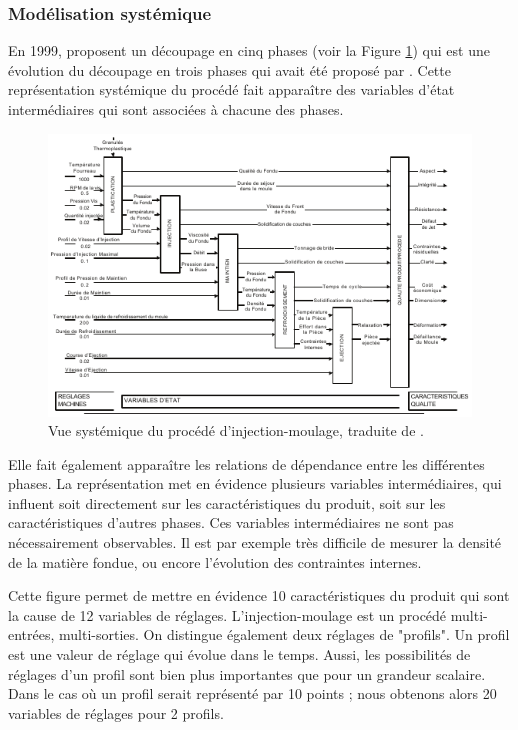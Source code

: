 \subsubsection{Modélisation systémique} \label{subsubsec:molding_systemic}
En 1999, \citeauthor{kazmer_towards_1999} proposent un découpage en cinq phases \cite{kazmer_towards_1999} (voir la Figure \ref{fig:kazmer_systematic}) qui est une évolution du découpage en trois phases qui avait été proposé par \citeauthor{ma_design_1974} \cite{ma_design_1974}.
Cette représentation systémique du procédé fait apparaître des variables d’état intermédiaires qui sont associées à chacune des phases.

\begin{figure}[bthp]
	\centering
	\includegraphics[width=\textwidth,height=\textheight,keepaspectratio]{../Chap1/Figures/Kazmer_1999-Process.pdf}
	\caption{Vue systémique du procédé d'injection-moulage, traduite de \citeauthor{kazmer_towards_1999} \cite{kazmer_towards_1999}.}
	\label{fig:kazmer_systematic}
\end{figure}

Elle fait également apparaître les relations de dépendance entre les différentes phases.
La représentation met en évidence plusieurs variables intermédiaires, qui influent soit directement sur les caractéristiques du produit, soit sur les caractéristiques d'autres phases.
Ces variables intermédiaires ne sont pas nécessairement observables.
Il est par exemple très difficile de mesurer la densité de la matière fondue, ou encore l'évolution des contraintes internes.

Cette figure permet de mettre en évidence 10 caractéristiques du produit qui sont la cause de 12 variables de réglages.
L'injection-moulage est un procédé multi-entrées, multi-sorties.
On distingue également deux réglages de "profils".
Un profil est une valeur de réglage qui évolue dans le temps.
Aussi, les possibilités de réglages d'un profil sont bien plus importantes que pour un grandeur scalaire. Dans le cas où un profil serait représenté par 10 points ; nous obtenons alors 20 variables de réglages pour 2 profils.


